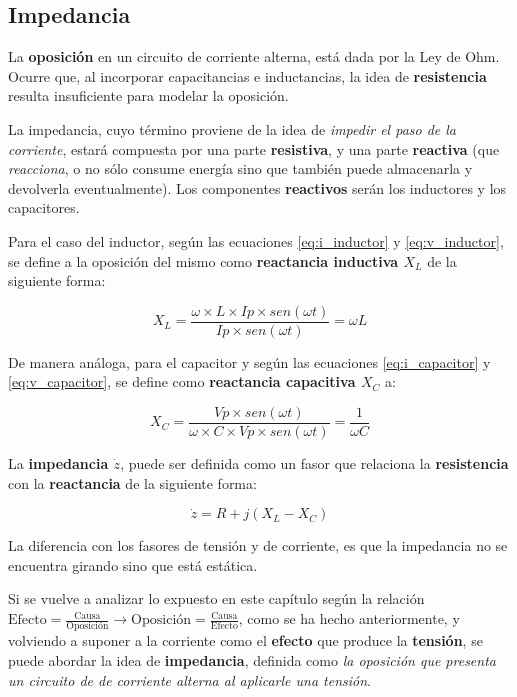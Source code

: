\subsection{Impedancia}

La \textbf{oposición} en un circuito de corriente alterna, está dada por la Ley de Ohm. Ocurre que, al incorporar capacitancias e inductancias, la idea de \textbf{resistencia} resulta insuficiente para modelar la oposición.

La impedancia, cuyo término proviene de la idea de \textit{impedir el paso de la corriente}, estará compuesta por una parte \textbf{resistiva}, y una parte \textbf{reactiva} (que \textit{reacciona}, o no sólo consume energía sino que también puede almacenarla y devolverla eventualmente). Los componentes \textbf{reactivos} serán los inductores y los capacitores.

Para el caso del inductor, según las ecuaciones \ref{eq:i_inductor} y \ref{eq:v_inductor}, se define a la oposición del mismo como \textbf{reactancia inductiva $X_L$} de la siguiente forma:

$$ X_L = \frac{\omega \times L \times Ip \times sen(\omega t)}{Ip\times sen(\omega t)} = \omega L $$

De manera análoga, para el capacitor y según las ecuaciones \ref{eq:i_capacitor} y \ref{eq:v_capacitor}, se define como \textbf{reactancia capacitiva $X_C$} a:

$$ X_C = \frac{Vp\times sen(\omega t)}{\omega \times C \times Vp \times sen(\omega t)} = \frac{1}{\omega C} $$

La \textbf{impedancia $\dot{z}$}, puede ser definida como un fasor que relaciona la \textbf{resistencia} con la \textbf{reactancia} de la siguiente forma:

\begin{equation}
	\label{eq:impedancia_rectangular}
	\dot{z} = R + j(X_L-X_C)
\end{equation}


La diferencia con los fasores de tensión y de corriente, es que la impedancia no se encuentra girando sino que está estática.

Si se vuelve a analizar lo expuesto en este capítulo según la relación $\text{Efecto} = \frac{\text{Causa}}{\text{Oposición}} \rightarrow \text{Oposición} = \frac{\text{Causa}}{\text{Efecto}}$, como se ha hecho anteriormente, y volviendo a suponer a la corriente como el \textbf{efecto} que produce la \textbf{tensión}, se puede abordar la idea de \textbf{impedancia}, definida como \textit{la oposición que presenta un circuito de de corriente alterna al aplicarle una tensión}.

